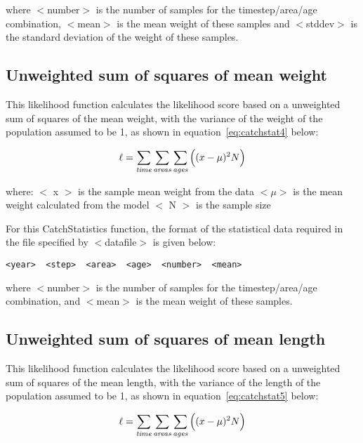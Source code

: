 \documentclass [a4paper, 10pt]{book}
\begin{document}
where $<$number$>$ is the number of samples for the timestep/area/age combination, $<$mean$>$ is the mean weight of these samples and $<$stddev$>$ is the standard deviation of the weight of these samples.

\subsection{Unweighted sum of squares of mean weight}
This likelihood function calculates the likelihood score based on a unweighted sum of squares of the mean weight, with the variance of the weight of the population assumed to be 1, as shown in equation~\ref{eq:catchstat4} below:

\begin{equation}\label{eq:catchstat4}
\ell = \sum_{\it time}\sum_{\it areas}\sum_{\it ages} \Big((x-\mu)^2 N\Big)
\end{equation}

where:\newline
$<$ x $>$ is the sample mean weight from the data\newline
$<\mu>$ is the mean weight calculated from the model\newline
$<$ N $>$ is the sample size

\bigskip
For this CatchStatistics function, the format of the statistical data required in the file specified by $<$datafile$>$ is given below:

{\small\begin{verbatim}
<year>  <step>  <area>  <age>  <number>  <mean>
\end{verbatim}}

where $<$number$>$ is the number of samples for the timestep/area/age combination, and $<$mean$>$ is the mean weight of these samples.

\subsection{Unweighted sum of squares of mean length}
This likelihood function calculates the likelihood score based on a unweighted sum of squares of the mean length, with the variance of the length of the population assumed to be 1, as shown in equation~\ref{eq:catchstat5} below:

\begin{equation}\label{eq:catchstat5}
\ell = \sum_{\it time}\sum_{\it areas}\sum_{\it ages} \Big((x-\mu)^2 N\Big)
\end{equation}
\end{document}
